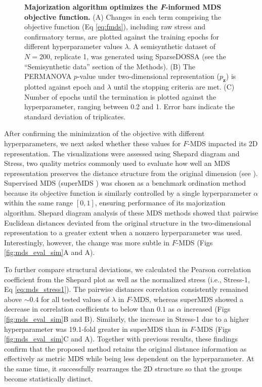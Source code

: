 \documentclass[10pt,letterpaper]{article}
\newcommand{\1}{{\rm 1}\kern-0.24em{\rm I}}
\begin{document}
\begin{figure}[h!]
    \centering
    \caption{\textbf{Majorization algorithm optimizes the \textit{F}-informed MDS objective function.} (A) Changes in each term comprising the objective function (Eq \ref{eq:fmds}), including raw stress and confirmatory terms, are plotted against the training epochs for different hyperparameter values $\lambda$. A semisynthetic dataset of $N=200$, replicate 1, was generated using SparseDOSSA \cite{Ma21} (see the ``Semisynthetic data'' section of the Methods). (B) The PERMANOVA $p$-value under two-dimensional representation ($p_\mathbf{z}$) is plotted against epoch and $\lambda$ until the stopping criteria are met. (C) Number of epochs until the termination is plotted against the hyperparameter, ranging between 0.2 and 1. Error bars indicate the standard deviation of triplicates.}
    \label{fig:sim_iter}
\end{figure}


After confirming the minimization of the objective with different hyperparameters, we next asked whether these values for $F$-MDS impacted its 2D representation. The visualizations were assessed using Shepard diagram and Stress, two quality metrics commonly used to evaluate how well an MDS representation preserves the distance structure from the original dimension (see ). Supervised MDS (superMDS \cite{witten11}) was chosen as a benchmark ordination method because its objective function is similarly controlled by a single hyperparameter $\alpha$ within the same range $[0,1]$, ensuring performance of its majorization algorithm. Shepard diagram analysis of these MDS methods showed that pairwise Euclidean distances deviated from the original structure in the two-dimensional representation to a greater extent when a nonzero hyperparameter was used. Interestingly, however, the change was more subtle in $F$-MDS (Figs \ref{fig:mds_eval_sim}A and A). 

To further compare structural deviations, we calculated the Pearson correlation coefficient from the Shepard plot as well as the normalized stress (i.e., Stress-1, Eq \ref{eq:mds_stress1}). The pairwise distances correlation consistently remained above $\sim\!0.4$ for all tested values of $\lambda$ in $F$-MDS, whereas superMDS showed a decrease in correlation coefficients to below than $0.1$ as $\alpha$ increased (Figs \ref{fig:mds_eval_sim}B and B). Similarly, the increase in Stress-1 due to a higher hyperparameter was 19.1-fold greater in superMDS than in $F$-MDS (Figs \ref{fig:mds_eval_sim}C and A). Together with previous results, these findings confirm that the proposed method retains the original distance information as effectively as metric MDS while being less dependent on the hyperparameter. At the same time, it successfully rearranges the 2D structure so that the groups become statistically distinct. 
\end{document}
